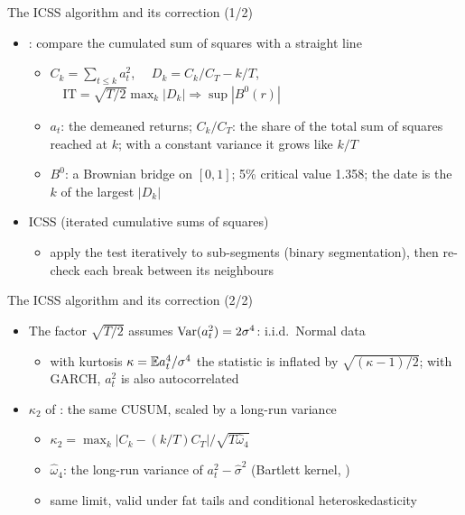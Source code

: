 \begin{frame}{The ICSS algorithm and its correction (1/2)}
\itemsize{\small}
\begin{itemize}
    \item {}: compare the cumulated sum of squares with a straight line
    \begin{itemize}
        \item $C_k = \sum_{t \le k} a_t^2$, $\quad D_k = C_k/C_T - k/T$, $\quad \mathrm{IT} = \sqrt{T/2}\max_k|D_k| \Rightarrow \sup|B^0(r)|$
        \item $a_t$: the demeaned returns; $C_k/C_T$: the share of the total sum of squares reached at $k$; with a constant variance it grows like $k/T$
        \item $B^0$: a Brownian bridge on $[0,1]$; 5\% critical value 1.358; the date is the $k$ of the largest $|D_k|$
    \end{itemize}
    \item ICSS (iterated cumulative sums of squares)
    \begin{itemize}
        \item apply the test iteratively to sub-segments (binary segmentation), then re-check each break between its neighbours
    \end{itemize}
\end{itemize}
\end{frame}

\begin{frame}{The ICSS algorithm and its correction (2/2)}
\itemsize{\small}
\begin{itemize}
    \item The factor $\sqrt{T/2}$ assumes $\text{Var}(a_t^2) = 2\sigma^4$: i.i.d.\ Normal data
    \begin{itemize}
        \item with kurtosis $\kappa = \mathbb{E} a_t^4/\sigma^4$ the statistic is inflated by $\sqrt{(\kappa - 1)/2}$; with GARCH, $a_t^2$ is also autocorrelated
    \end{itemize}
    \item $\kappa_2$ of : the same CUSUM, scaled by a long-run variance
    \begin{itemize}
        \item $\kappa_2 = \max_k|C_k - (k/T)C_T|/\sqrt{T\hat\omega_4}$
        \item $\hat\omega_4$: the long-run variance of $a_t^2 - \hat\sigma^2$ (Bartlett kernel, )
        \item same limit, valid under fat tails and conditional heteroskedasticity
    \end{itemize}
\end{itemize}
\end{frame}

